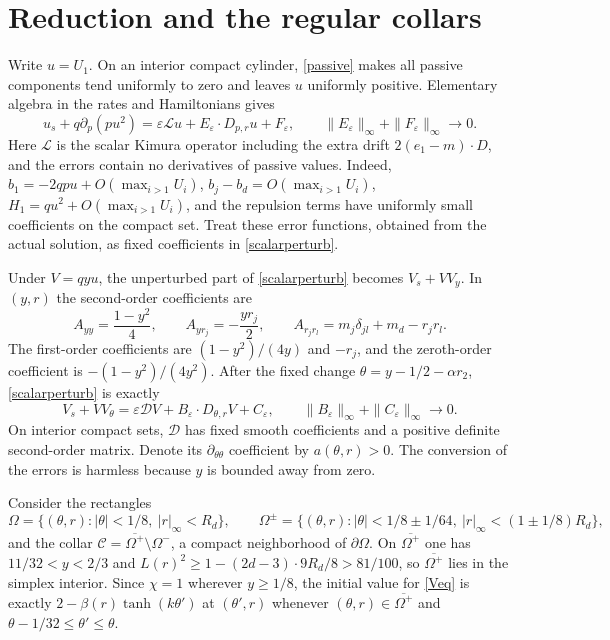 \documentclass[11pt]{article}
\newcommand{\eps}{\varepsilon}
\newcommand{\cD}{\mathcal D}
\begin{document}
\section{Reduction and the regular collars}
Write $u=U_1$. On an interior compact cylinder, \eqref{passive} makes all passive components tend uniformly to zero and leaves $u$ uniformly positive. Elementary algebra in the rates and Hamiltonians gives
\begin{equation}\label{scalarperturb}
 u_s+q\partial_p(pu^2)
 =\eps\mathcal L u+E_\eps\cdot D_{p,r}u+F_\eps,
 \qquad \|E_\eps\|_\infty+\|F_\eps\|_\infty\longrightarrow0.
\end{equation}
Here $\mathcal L$ is the scalar Kimura operator including the extra drift $2(e_1-m)\cdot D$, and the errors contain no derivatives of passive values. Indeed,
$b_1=-2qpu+O(\max_{i>1}U_i)$, $b_j-b_d=O(\max_{i>1}U_i)$, $H_1=qu^2+O(\max_{i>1}U_i)$, and the repulsion terms have uniformly small coefficients on the compact set. Treat these error functions, obtained from the actual solution, as fixed coefficients in \eqref{scalarperturb}.

Under $V=qyu$, the unperturbed part of \eqref{scalarperturb} becomes $V_s+VV_y$. In $(y,r)$ the second-order coefficients are
\begin{equation}\label{coefficients}
 A_{yy}=\frac{1-y^2}{4},\qquad A_{yr_j}=-\frac{yr_j}{2},\qquad
 A_{r_jr_l}=m_j\delta_{jl}+m_d-r_jr_l.
\end{equation}
The first-order coefficients are $(1-y^2)/(4y)$ and $-r_j$, and the zeroth-order coefficient is $-(1-y^2)/(4y^2)$. After the fixed change $\theta=y-1/2-\alpha r_2$, \eqref{scalarperturb} is exactly
\begin{equation}\label{Veq}
 V_s+VV_\theta=\eps\cD V+B_\eps\cdot D_{\theta,r}V+C_\eps,
 \qquad \|B_\eps\|_\infty+\|C_\eps\|_\infty\longrightarrow0.
\end{equation}
On interior compact sets, $\cD$ has fixed smooth coefficients and a positive definite second-order matrix. Denote its $\partial_{\theta\theta}$ coefficient by $a(\theta,r)>0$. The conversion of the errors is harmless because $y$ is bounded away from zero.

Consider the rectangles
\[
 \Omega=\{(\theta,r):|\theta|<1/8,\ |r|_\infty<R_d\},\qquad
 \Omega^\pm=\{(\theta,r):|\theta|<1/8\pm1/64,\ |r|_\infty<(1\pm1/8)R_d\},
\]
and the collar $\mathcal C=\overline{\Omega^+}\setminus\Omega^-$, a compact neighborhood of $\partial\Omega$. On $\overline{\Omega^+}$ one has $11/32<y<2/3$ and $L(r)^2\ge1-(2d-3)\cdot9R_d/8>81/100$, so $\overline{\Omega^+}$ lies in the simplex interior. Since $\chi=1$ wherever $y\ge1/8$, the initial value for \eqref{Veq} is exactly $2-\beta(r)\tanh(k\theta')$ at $(\theta',r)$ whenever $(\theta,r)\in\overline{\Omega^+}$ and $\theta-1/32\le\theta'\le\theta$.
\end{document}
